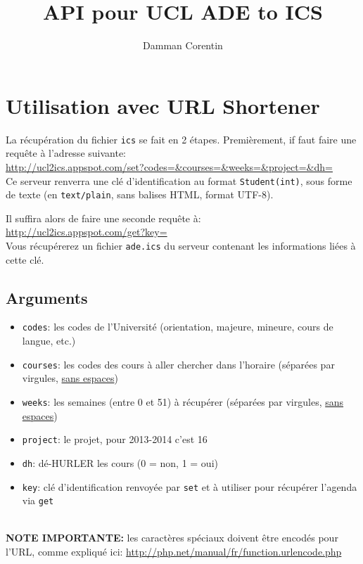 \documentclass[12pt,a4paper]{article}
\author{Damman Corentin}
\title{API pour \og UCL ADE to ICS \fg{}}
\begin{document}
\maketitle

\section{Utilisation avec URL Shortener}

La récupération du fichier \verb#ics# se fait en 2 étapes. Premièrement, if faut faire une requête à l'adresse suivante:\\
\url{http://ucl2ics.appspot.com/set?codes=&courses=&weeks=&project=&dh=}\\

Ce serveur renverra une clé d'identification au format \verb#Student(int)#, sous forme de texte (en \verb#text/plain#, sans balises HTML, format UTF-8).

Il suffira alors de faire une seconde requête à:\\
\url{http://ucl2ics.appspot.com/get?key=}\\

Vous récupérerez un fichier \verb#ade.ics# du serveur contenant les informations liées à cette clé.

\subsection{Arguments}
\begin{itemize}
\item \verb#codes#: les codes de l'Université (orientation, majeure, mineure, cours de langue, etc.)
\item \verb#courses#: les codes des cours à aller chercher dans l'horaire (séparées par virgules, \uline{sans espaces})
\item \verb#weeks#: les semaines (entre 0 et 51) à récupérer (séparées par virgules, \uline{sans espaces})
\item \verb#project#: le projet, pour 2013-2014 c'est 16
\item \verb#dh#: dé-HURLER les cours (0 = non, 1 = oui)\\

\item \verb#key#: clé d'identification renvoyée par \verb#set# et à utiliser pour récupérer l'agenda via \verb#get#
\end{itemize}

~\\
\textbf{NOTE IMPORTANTE:} les caractères spéciaux doivent être encodés pour l'URL, comme expliqué ici: \url{http://php.net/manual/fr/function.urlencode.php}
\end{document}
